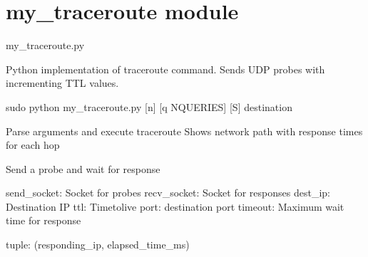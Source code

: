 \documentclass[letterpaper,10pt,english]{sphinxmanual}
\begin{document}
\sphinxstepscope


\chapter{my\_traceroute module}
\label{\detokenize{my_traceroute:module-my_traceroute}}\label{\detokenize{my_traceroute:my-traceroute-module}}\label{\detokenize{my_traceroute::doc}}
\sphinxAtStartPar
my\_traceroute.py

\sphinxAtStartPar
Python implementation of traceroute command.
Sends UDP probes with incrementing TTL values.
\begin{description}
\sphinxAtStartPar
sudo python my\_traceroute.py {[}\sphinxhyphen{}n{]} {[}\sphinxhyphen{}q NQUERIES{]} {[}\sphinxhyphen{}S{]} destination

\end{description}

\begin{fulllineitems}
\label{\detokenize{my_traceroute:my_traceroute.main}}
\pysigstartsignatures
\pysiglinewithargsret
{}
{}
{}
\pysigstopsignatures
\sphinxAtStartPar
Parse arguments and execute traceroute
Shows network path with response times for each hop

\end{fulllineitems}


\begin{fulllineitems}
\label{\detokenize{my_traceroute:my_traceroute.send_probe}}
\pysigstartsignatures
\pysiglinewithargsret
{}
{\sphinxparamcomma {}\sphinxparamcomma {}\sphinxparamcomma {}\sphinxparamcomma {}\sphinxparamcomma {}}
{}
\pysigstopsignatures
\sphinxAtStartPar
Send a probe and wait for response
\begin{description}
\sphinxAtStartPar
send\_socket: Socket for probes
recv\_socket: Socket for responses
dest\_ip: Destination IP
ttl: Time\sphinxhyphen{}to\sphinxhyphen{}live
port: destination port
timeout: Maximum wait time for response

\sphinxAtStartPar
tuple: (responding\_ip, elapsed\_time\_ms)

\end{description}

\end{fulllineitems}
\end{document}
